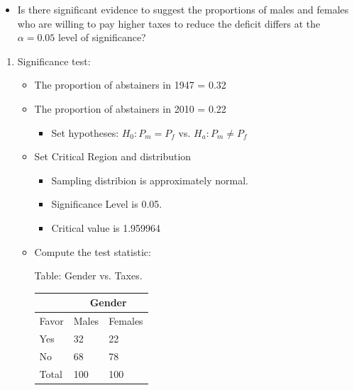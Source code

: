 \documentclass[11pt, chapterprefix=true]{scrbook}\usepackage[]{graphicx}\usepackage[]{color}
\begin{document}
\begin{exercises}
\begin{exercise}
\begin{itemize}
\item Is there significant evidence to suggest the proportions of males and females \\ who are willing to pay higher taxes to reduce the deficit differs at the $\alpha = 0.05$ level of significance?
\end{itemize}

  \vspace{5mm}

\end{exercise}
\vspace{2mm}
\begin{solution}

  	  \begin{enumerate}
	 \item Significance test:


\begin{itemize}
\item The proportion of abstainers in 1947 = 0.32
\item The proportion of abstainers in 2010 = 0.22
  \begin{itemize}
  \item Set hypotheses: $H_0: P_m = P_f$ vs. $H_a: P_m \ne P_f$
  \end{itemize}

\item Set Critical Region and distribution

  \begin{itemize}
  \item Sampling distribion is approximately normal.
  \item Significance Level is 0.05.
  \item Critical value is 1.959964
  \end{itemize}

\item Compute the test statistic:

\begin{minipage}[h]{6cm}

Table: Gender vs. Taxes.



      \begin{tabular}{@{} p{2.5cm} p{1cm} p{1cm} @{}} \hline %
     &  \multicolumn{2}{c}{Gender } \\ \hline
     Favor   & Males & Females \\ \hline
     Yes   & 32 & 22 \\
     No          & 68 & 78 \\ \hline
     Total        & 100 & 100 \\ \hline
   \end{tabular}


\end{minipage}
\end{itemize}
\end{enumerate}
\end{solution}
\end{exercises}
\end{document}
